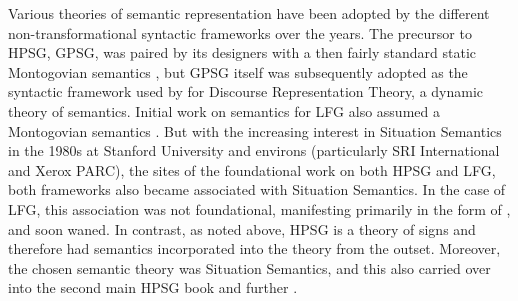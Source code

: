 %
%
%

Various theories of semantic representation have been adopted by the different non-transformational syntactic frameworks over the years.  
The precursor to HPSG, GPSG, was paired by its designers with a then fairly standard static Montogovian semantics \citep{GKPS85a}, but GPSG itself was subsequently adopted as the syntactic framework used by \citet[9]{kamp;reyle93} for Discourse Representation Theory, a dynamic theory of semantics.  Initial work on semantics for LFG also assumed a Montogovian semantics \citep{halvorsen83,halvorsen;kaplan88}.  But with the increasing interest in Situation Semantics \citep{barwise;perry83} in the 1980s at Stanford University and environs (particularly SRI International and Xerox PARC), the sites of the foundational work on both HPSG and LFG, both frameworks also became associated with Situation Semantics.  In the case of LFG, this association was not foundational, manifesting primarily in the form of \citet{fenstad;ea87}, and soon waned. In contrast, as noted above, HPSG is a theory of signs and therefore had semantics incorporated into the theory from the outset.  Moreover, the chosen semantic theory was Situation Semantics, and this also carried over into the second main HPSG book \citep{ps2} and further \citep{ginzburg;sag00}.

